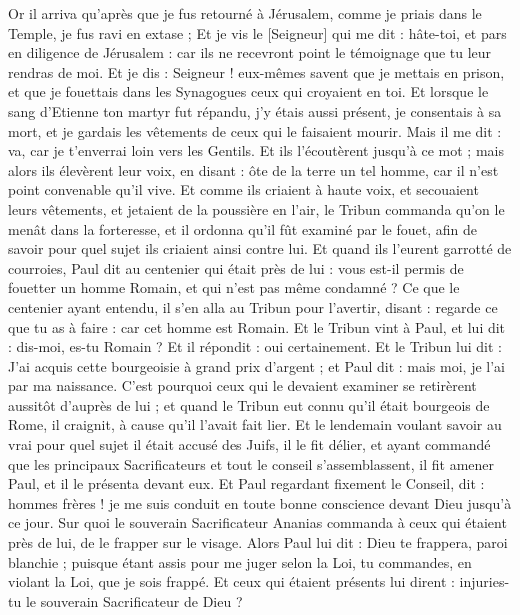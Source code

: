 \begin{multicols}{2}
Or il arriva qu'après que je fus retourné à Jérusalem, comme je priais dans le Temple, je fus ravi en extase ;
Et je vis le [Seigneur] qui me dit : hâte-toi, et pars en diligence de Jérusalem : car ils ne recevront point le témoignage que tu leur rendras de moi.
Et je dis : Seigneur ! eux-mêmes savent que je mettais en prison, et que je fouettais dans les Synagogues ceux qui croyaient en toi.
Et lorsque le sang d'Etienne ton martyr fut répandu, j'y étais aussi présent, je consentais à sa mort, et je gardais les vêtements de ceux qui le faisaient mourir.
Mais il me dit : va, car je t'enverrai loin vers les Gentils.
Et ils l'écoutèrent jusqu'à ce mot ; mais alors ils élevèrent leur voix, en disant : ôte de la terre un tel homme, car il n'est point convenable qu'il vive.
Et comme ils criaient à haute voix, et secouaient leurs vêtements, et jetaient de la poussière en l'air,
le Tribun commanda qu'on le menât dans la forteresse, et il ordonna qu'il fût examiné par le fouet, afin de savoir pour quel sujet ils criaient ainsi contre lui.
Et quand ils l'eurent garrotté de courroies, Paul dit au centenier qui était près de lui : vous est-il permis de fouetter un homme Romain, et qui n'est pas même condamné ?
Ce que le centenier ayant entendu, il s'en alla au Tribun pour l'avertir, disant : regarde ce que tu as à faire : car cet homme est Romain.
Et le Tribun vint à Paul, et lui dit : dis-moi, es-tu Romain ? Et il répondit : oui certainement.
Et le Tribun lui dit : J'ai acquis cette bourgeoisie à grand prix d'argent ; et Paul dit : mais moi, je l'ai par ma naissance.
C'est pourquoi ceux qui le devaient examiner se retirèrent aussitôt d'auprès de lui ; et quand le Tribun eut connu qu'il était bourgeois de Rome, il craignit, à cause qu'il l'avait fait lier.
Et le lendemain voulant savoir au vrai pour quel sujet il était accusé des Juifs, il le fit délier, et ayant commandé que les principaux Sacrificateurs et tout le conseil s'assemblassent, il fit amener Paul, et il le présenta devant eux.
\VerseOne{}Et Paul regardant fixement le Conseil, dit : hommes frères ! je me suis conduit en toute bonne conscience devant Dieu jusqu'à ce jour.
Sur quoi le souverain Sacrificateur Ananias commanda à ceux qui étaient près de lui, de le frapper sur le visage.
Alors Paul lui dit : Dieu te frappera, paroi blanchie ; puisque étant assis pour me juger selon la Loi, tu commandes, en violant la Loi, que je sois frappé.
Et ceux qui étaient présents lui dirent : injuries-tu le souverain Sacrificateur de Dieu ?

\end{multicols}
